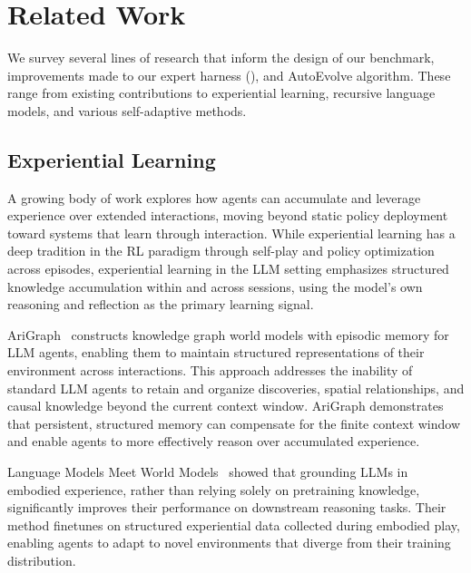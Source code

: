 
\section{Related Work}\label{sec:related_work}

We survey several lines of research that inform the design of our benchmark, improvements made to our expert harness (\pokeagent{}), and AutoEvolve algorithm. These range from existing contributions to experiential learning, recursive language models, and various self-adaptive methods.

\subsection{Experiential Learning}\label{sec:experiential_learning}

A growing body of work explores how agents can accumulate and leverage experience over extended interactions, moving beyond static policy deployment toward systems that learn through interaction. While experiential learning has a deep tradition in the RL paradigm through self-play and policy optimization across episodes, experiential learning in the LLM setting emphasizes structured knowledge accumulation within and across sessions, using the model's own reasoning and reflection as the primary learning signal.

AriGraph~\citep{anokhin2024arigraph} constructs knowledge graph world models with episodic memory for LLM agents, enabling them to maintain structured representations of their environment across interactions. This approach addresses the inability of standard LLM agents to retain and organize discoveries, spatial relationships, and causal knowledge beyond the current context window. AriGraph demonstrates that persistent, structured memory can compensate for the finite context window and enable agents to more effectively reason over accumulated experience.

Language Models Meet World Models~\citep{xiang2023embodied} showed that grounding LLMs in embodied experience, rather than relying solely on pretraining knowledge, significantly improves their performance on downstream reasoning tasks. Their method finetunes on structured experiential data collected during embodied play, enabling agents to adapt to novel environments that diverge from their training distribution.

